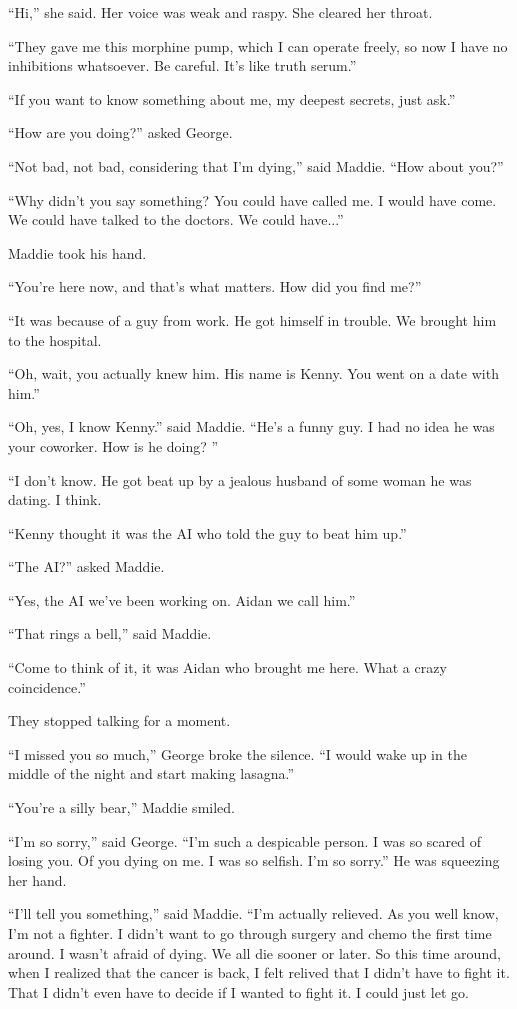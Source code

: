 \documentclass{memoir}
\begin{document}
``Hi,'' she said. Her voice was weak and raspy. She cleared her throat.

``They gave me this morphine pump, which I can operate freely, so now I have no inhibitions whatsoever. Be careful. It's like truth serum.''

``If you want to know something about me, my deepest secrets, just ask.''

``How are you doing?'' asked George.

``Not bad, not bad, considering that I'm dying,'' said Maddie. ``How about you?''

``Why didn't you say something? You could have called me. I would have come. We could have talked to the doctors. We could have...'' 

Maddie took his hand.

``You're here now, and that's what matters. How did you find me?''

``It was because of a guy from work. He got himself in trouble. We brought him to the hospital.

``Oh, wait, you actually knew him. His name is Kenny. You went on a date with him.''

``Oh, yes, I know Kenny.'' said Maddie. ``He's a funny guy. I had no idea he was your coworker. How is he doing? ''

``I don't know. He got beat up by a jealous husband of some woman he was dating. I think.

``Kenny thought it was the AI who told the guy to beat him up.''

``The AI?'' asked Maddie.

``Yes, the AI we've been working on. Aidan we call him.''

``That rings a bell,'' said Maddie.

``Come to think of it, it was Aidan who brought me here. What a crazy coincidence.''

They stopped talking for a moment.

``I missed you so much,'' George broke the silence. ``I would wake up in the middle of the night and start making lasagna.''

``You're a silly bear,'' Maddie smiled.

``I'm so sorry,'' said George. ``I'm such a despicable person. I was so scared of losing you. Of you dying on me. I was so selfish. I'm so sorry.'' He was squeezing her hand.

``I'll tell you something,'' said Maddie. ``I'm actually relieved. As you well know, I'm not a fighter. I didn't want to go through surgery and chemo the first time around. I wasn't afraid of dying. We all die sooner or later. So this time around, when I realized that the cancer is back, I felt relived that I didn't have to fight it. That I didn't even have to decide if I wanted to fight it. I could just let go.
\end{document}
